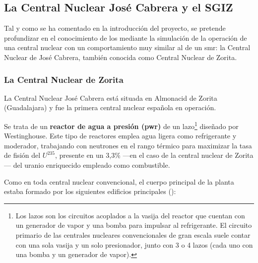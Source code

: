 \subsection{La Central Nuclear José Cabrera y el SGIZ}

Tal y como se ha comentado en la introducción del proyecto, se pretende profundizar en el conocimiento de los \emph{} mediante la simulación de la operación de una central nuclear con un comportamiento muy similar al de un \acrshort{smr}: la Central Nuclear de José Cabrera, también conocida como Central Nuclear de Zorita.

\subsubsection{La Central Nuclear de Zorita}

La Central Nuclear José Cabrera está situada en Almonacid de Zorita (Guadalajara) y fue la primera central nuclear española en operación.

Se trata de un \textbf{reactor de agua a presión (\acrshort{pwr})} de un lazo\footnote{Los lazos son los circuitos acoplados a la vasija del reactor que cuentan con un generador de vapor y una bomba para impulsar al refrigerante. El circuito primario de las centrales nucleares convencionales de gran escala suele contar con una sola vasija y un solo presionador, junto con 3 o 4 lazos (cada uno con una bomba y un generador de vapor).} diseñado por Westinghouse. Este tipo de reactores emplea agua ligera como refrigerante y moderador, trabajando con neutrones en el rango térmico para maximizar la tasa de fisión del $U^{235}$, presente en un 3,3\% ---en el caso de la central nuclear de Zorita--- del uranio enriquecido empleado como combustible.

Como en toda central nuclear convencional, el cuerpo principal de la planta estaba formado por los siguientes edificios principales (\cite{documentacion_sgiz}):

